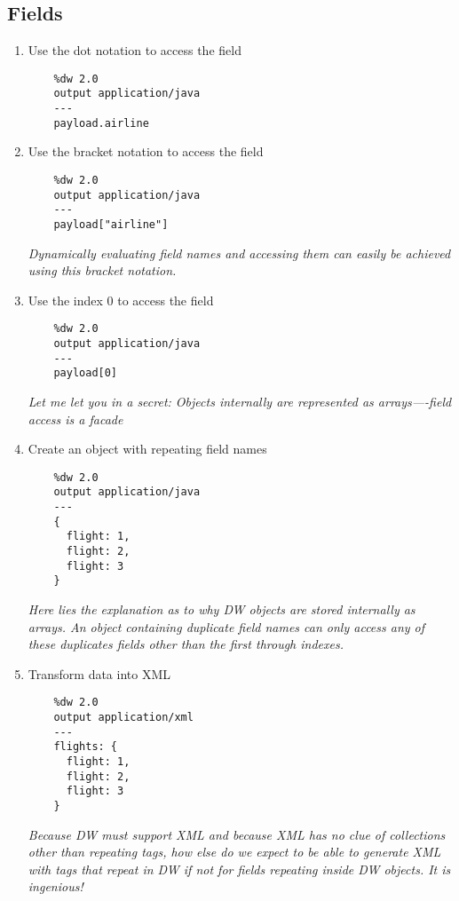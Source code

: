 \subsection{Fields}
\begin{enumerate}[resume*]
\item Use the dot notation to access the  field
  \begin{lstlisting}
    %dw 2.0
    output application/java
    ---
    payload.airline    
  \end{lstlisting}
\item Use the bracket notation to access the  field
  \begin{lstlisting}
    %dw 2.0
    output application/java
    ---
    payload["airline"]    
  \end{lstlisting}
  \emph{
    Dynamically evaluating field names and accessing them can easily be achieved using this bracket notation.
  }
\item Use the index 0 to access the  field
  \begin{lstlisting}
    %dw 2.0
    output application/java
    ---
    payload[0]
  \end{lstlisting}
  \emph{
    Let me let you in a secret: Objects internally are represented as arrays—-field access is a facade
  }
\item Create an object with repeating field names
  \begin{lstlisting}
    %dw 2.0
    output application/java
    ---
    {
      flight: 1,
      flight: 2,
      flight: 3
    }
  \end{lstlisting}
  \emph{
    Here lies the explanation as to why DW objects are stored internally as arrays.  An object containing duplicate field names can only access any of these duplicates fields other than the first through indexes.
    }
\item Transform data into XML
  \begin{lstlisting}
    %dw 2.0
    output application/xml
    ---
    flights: {
      flight: 1,
      flight: 2,
      flight: 3
    }
  \end{lstlisting}
  \emph{
    Because DW must support XML and because XML has no clue of collections other than repeating tags, how else do we expect to be able to generate XML with tags that repeat in DW if not for fields repeating inside DW objects.  It is ingenious!
  }
\end{enumerate}


